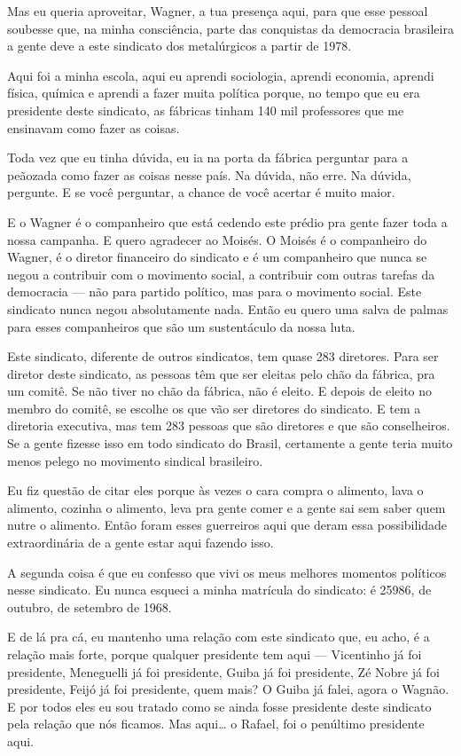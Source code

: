 Mas eu queria aproveitar, Wagner, a tua presença aqui, para que
esse pessoal soubesse que, na minha consciência, parte das conquistas da
democracia brasileira a gente deve a este sindicato dos metalúrgicos a
partir de 1978.

Aqui foi a minha escola, aqui eu aprendi sociologia, aprendi
economia, aprendi física, química e aprendi a fazer muita política
porque, no tempo que eu era presidente deste sindicato, as fábricas
tinham 140 mil professores que me ensinavam como fazer as coisas.

Toda vez que eu tinha dúvida, eu ia na porta da fábrica perguntar
para a peãozada como fazer as coisas nesse país. Na dúvida, não erre. Na
dúvida, pergunte. E se você perguntar, a chance de você acertar é muito
maior.

E o Wagner é o companheiro que está cedendo este prédio pra gente
fazer toda a nossa campanha. E quero agradecer ao Moisés. O Moisés é o
companheiro do Wagner, é o diretor financeiro do sindicato e é um
companheiro que nunca se negou a contribuir com o movimento social, a
contribuir com outras tarefas da democracia --- não para partido
político, mas para o movimento social. Este sindicato nunca negou
absolutamente nada. Então eu quero uma salva de palmas para esses
companheiros que são um sustentáculo da nossa luta.

Este sindicato, diferente de outros sindicatos, tem quase 283
diretores. Para ser diretor deste sindicato, as pessoas têm que ser
eleitas pelo chão da fábrica, pra um comitê. Se não tiver no chão da
fábrica, não é eleito. E depois de eleito no membro do comitê, se
escolhe os que vão ser diretores do sindicato. E tem a diretoria
executiva, mas tem 283 pessoas que são diretores e que são conselheiros.
Se a gente fizesse isso em todo sindicato do Brasil, certamente a gente
teria muito menos pelego no movimento sindical brasileiro.

Eu fiz questão de citar eles porque às vezes o cara compra o
alimento, lava o alimento, cozinha o alimento, leva pra gente comer e a
gente sai sem saber quem nutre o alimento. Então foram esses guerreiros
aqui que deram essa possibilidade extraordinária de a gente estar aqui
fazendo isso.

A segunda coisa é que eu confesso que vivi os meus melhores
momentos políticos nesse sindicato. Eu nunca esqueci a minha matrícula
do sindicato: é 25986, de outubro, de setembro de
1968.

E de lá pra cá, eu mantenho uma relação com este sindicato que, eu
acho, é a relação mais forte, porque qualquer presidente tem aqui ---
Vicentinho já foi presidente, Meneguelli já foi presidente, Guiba já foi
presidente, Zé Nobre já foi presidente, Feijó já foi presidente, quem
mais? O Guiba já falei, agora o Wagnão. E por todos eles eu sou tratado
como se ainda fosse presidente deste sindicato pela relação que nós
ficamos. Mas aqui\ldots{} o Rafael, foi o penúltimo presidente aqui.

